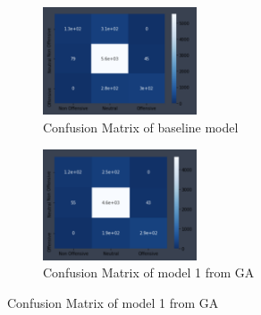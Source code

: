 \documentclass[11pt, natbib=false]{article}
\begin{document}
\newpage
\begin{figure}[h!]\ContinuedFloat
  \centering

  \begin{subfigure}[b]{1.0\linewidth}
  \centering
  \caption{Confusion Matrix of baseline model}
  \includegraphics[width=0.5\textwidth]{./baseline_model_cm.png}
  \end{subfigure}

  \begin{subfigure}[b]{1.0\linewidth}
  \centering
  \caption{Confusion Matrix of model 1 from GA}
  \includegraphics[width=0.5\textwidth]{./GA_model1_cm.png}
  \end{subfigure}

\end{figure}
\end{document}
